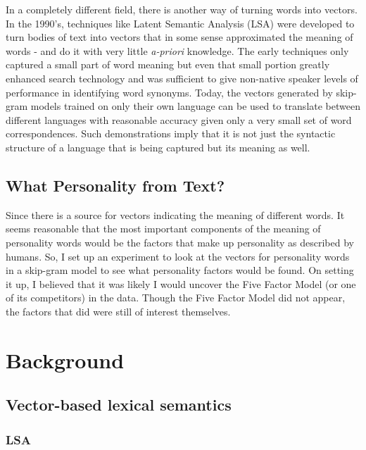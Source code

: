 \documentclass[eric_thesis.tex]{subfiles}
\begin{document}
In a completely different field, there is another way of turning words into 
vectors. In the 1990's, techniques like Latent Semantic Analysis (LSA) were 
developed to turn bodies of text into vectors that in some sense approximated 
the meaning of words - and do it with very little \textit{a-priori} knowledge. 
The early techniques only captured a small part of word meaning but even that
small portion greatly enhanced search technology and was sufficient to give
non-native speaker levels of performance in identifying word synonyms. Today, 
the vectors generated by skip-gram models trained on only their own language 
can be used to translate between different languages with reasonable accuracy 
given only a very small set of word correspondences. Such demonstrations imply 
that it is not just the syntactic structure of a language that is being 
captured but its meaning as well.

\section{What Personality from Text?}

Since there is a source for vectors indicating the meaning of different words. 
It seems reasonable that the most important components of the meaning of 
personality words would be the factors that make up personality as described by 
humans. So, I set up an experiment to look at the vectors for personality words 
in a skip-gram model to see what personality factors would be found. On setting 
it up, I believed that it was likely I would uncover the Five Factor Model (or 
one of its competitors) in the data. Though the Five Factor Model did not 
appear, the factors that did were still of interest themselves.

\chapter{Background}

\section{Vector-based lexical semantics}

\subsection{LSA}
\end{document}
